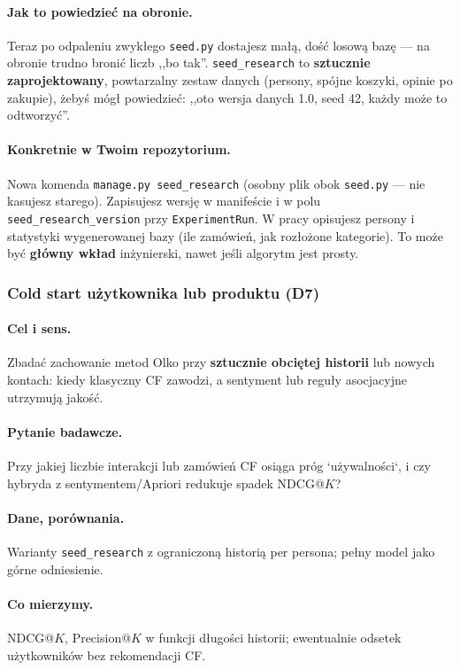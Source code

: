 \documentclass[a4paper,11pt]{article}
\newcommand{\code}[1]{\texttt{\small #1}}
\begin{document}
\paragraph{Jak to powiedzieć na obronie.}
Teraz po odpaleniu zwykłego \code{seed.py} dostajesz małą, dość losową bazę --- na obronie trudno bronić liczb ,,bo tak''. \texttt{seed\_research} to \textbf{sztucznie zaprojektowany}, powtarzalny zestaw danych (persony, spójne koszyki, opinie po zakupie), żebyś mógł powiedzieć: ,,oto wersja danych 1.0, seed 42, każdy może to odtworzyć''.

\paragraph{Konkretnie w Twoim repozytorium.}
Nowa komenda \code{manage.py seed\_research} (osobny plik obok \code{seed.py} --- nie kasujesz starego). Zapisujesz wersję w manifeście i w polu \code{seed\_research\_version} przy \code{ExperimentRun}. W pracy opisujesz persony i statystyki wygenerowanej bazy (ile zamówień, jak rozłożone kategorie). To może być \textbf{główny wkład} inżynierski, nawet jeśli algorytm jest prosty.

\subsubsection{Cold start użytkownika lub produktu (\textbf{D7})}

\paragraph{Cel i sens.}
Zbadać zachowanie metod Olko przy \textbf{sztucznie obciętej historii} lub nowych kontach: kiedy klasyczny CF zawodzi, a sentyment lub reguły asocjacyjne utrzymują jakość.

\paragraph{Pytanie badawcze.}
Przy jakiej liczbie interakcji lub zamówień CF osiąga próg `używalności`, i czy hybryda z sentymentem/Apriori redukuje spadek NDCG@$K$?

\paragraph{Dane, porównania.}
Warianty \texttt{seed\_research} z ograniczoną historią per persona; pełny model jako górne odniesienie.

\paragraph{Co mierzymy.}
NDCG@$K$, Precision@$K$ w funkcji długości historii; ewentualnie odsetek użytkowników bez rekomendacji CF.
\end{document}

